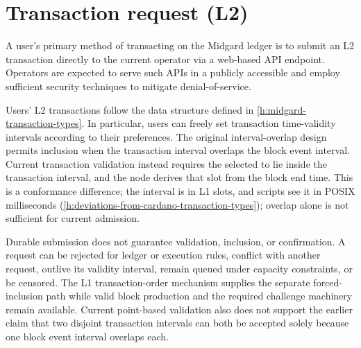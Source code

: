 \documentclass[../midgard.tex]{subfiles}
\begin{document}
\section{Transaction request (L2)}
\label{h:transaction-request}

A user's primary method of transacting on the Midgard ledger is to submit an L2 transaction directly to the current operator via a web-based API endpoint.
Operators are expected to serve such APIs in a publicly accessible and employ sufficient security techniques to mitigate denial-of-service.

Users' L2 transactions follow the data structure defined in \cref{h:midgard-transaction-types}.
In particular, users can freely set transaction time-validity intervals according to their preferences.
The original interval-overlap design permits inclusion when the transaction interval overlaps the block event interval.
Current transaction validation instead requires the selected  to lie inside the transaction interval, and the node derives that slot from the block end time.
This is a conformance difference; the interval is in L1 slots, and scripts see it in POSIX milliseconds (\cref{h:deviations-from-cardano-transaction-types}); overlap alone is not sufficient for current admission.

Durable submission does not guarantee validation, inclusion, or confirmation.
A request can be rejected for ledger or execution rules, conflict with another request, outlive its validity interval, remain queued under capacity constraints, or be censored.
The L1 transaction-order mechanism supplies the separate forced-inclusion path while valid block production and the required challenge machinery remain available.
Current point-based validation also does not support the earlier claim that two disjoint transaction intervals can both be accepted solely because one block event interval overlaps each.

\todo
\end{document}
